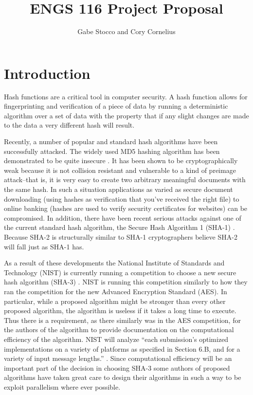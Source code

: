 \documentclass{article}
\title{ENGS 116 Project Proposal}
\author{Gabe Stocco and Cory Cornelius}
\begin{document}
\maketitle

\section{Introduction}
Hash functions are a critical tool in computer security.
A hash function allows for fingerprinting and verification of a piece of data by running a deterministic algorithm over a set of data with the property that if any slight changes are made to the data a very different hash will result.

Recently, a number of popular and standard hash algorithms have been successfully attacked.
The widely used MD5 hashing algorithm has been demonstrated to be quite insecure \cite{Nostradamus}.
It has been shown to be cryptographically weak because it is not collision resistant and vulnerable to a kind of preimage attack--that is, it is very easy to create two arbitrary meaningful documents with the same hash.
In such a situation applications as varied as secure document downloading (using hashes as verification that you've received the right file) to online banking (hashes are used to verify security certificates for websites) can be compromised.
In addition, there have been recent serious attacks against one of the current standard hash algorithm, the Secure Hash Algorithm 1 (SHA-1) \cite{Sha1Collisions}.
Because SHA-2 is structurally similar to SHA-1 cryptographers believe SHA-2 will fall just as SHA-1 has.

As a result of these developments the National Institute of Standards and Technology (NIST) is currently running a competition to choose a new secure hash algorithm (SHA-3) \cite{Sha3Request}.
NIST is running this competition similarly to how they ran the competition for the new Advanced Encryption Standard (AES).
In particular, while a proposed algorithm might be stronger than every other proposed algorithm, the algorithm is useless if it takes a long time to execute.
Thus there is a requirement, as there similarly was in the AES competition, for the authors of the algorithm to provide documentation on the computational efficiency of the algorithm.
NIST will analyze ``each submission’s optimized implementations on a variety of platforms as specified in Section 6.B, and for a variety of input message lengths.'' \cite{Sha3Request}.
Since computational efficiency will be an important part of the decision in choosing SHA-3 some authors of proposed algorithms have taken great care to design their algorithms in such a way to be exploit parallelism where ever possible.
\end{document}
